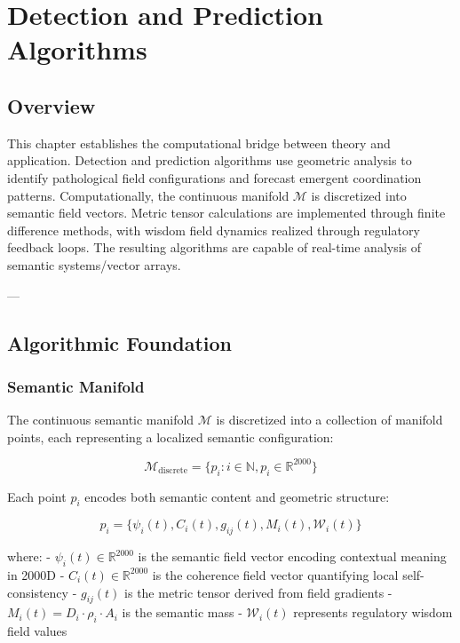 \chapter{Detection and Prediction Algorithms}

\section{Overview}

This chapter establishes the computational bridge between theory and application. Detection and prediction algorithms use geometric analysis to identify pathological field configurations and forecast emergent coordination patterns. Computationally, the continuous manifold $\mathcal{M}$ is discretized into semantic field vectors. Metric tensor calculations are implemented through finite difference methods, with wisdom field dynamics realized through regulatory feedback loops. The resulting algorithms are capable of real-time analysis of semantic systems/vector arrays.

---

\section{Algorithmic Foundation}

\subsection{Semantic Manifold}

The continuous semantic manifold $\mathcal{M}$ is discretized into a collection of manifold points, each representing a localized semantic configuration:

\begin{equation}
\mathcal{M}_{\text{discrete}} = \{p_i : i \in \mathbb{N}, p_i \in \mathbb{R}^{2000}\}
\end{equation}

Each point $p_i$ encodes both semantic content and geometric structure:

\begin{equation}
p_i = \{\psi_i(t), C_i(t), g_{ij}(t), M_i(t), \mathcal{W}_i(t)\}
\end{equation}

where:
- $\psi_i(t) \in \mathbb{R}^{2000}$ is the semantic field vector encoding contextual meaning in 2000D
- $C_i(t) \in \mathbb{R}^{2000}$ is the coherence field vector quantifying local self-consistency  
- $g_{ij}(t)$ is the metric tensor derived from field gradients
- $M_i(t) = D_i \cdot \rho_i \cdot A_i$ is the semantic mass
- $\mathcal{W}_i(t)$ represents regulatory wisdom field values

